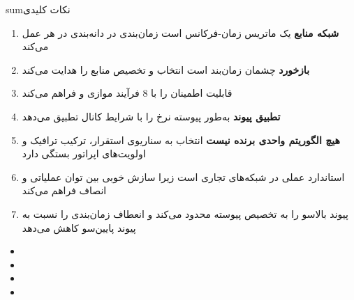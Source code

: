 \begin{CNbox}[unbreakable]{sum}{نکات کلیدی}

\begin{enumerate}
\def\labelenumi{\arabic{enumi}.}
\tightlist
\item
  \textbf{شبکه منابع} یک ماتریس زمان-فرکانس است  زمان‌بندی در دانه‌بندی  در هر  عمل می‌کند
\item
  \textbf{بازخورد } چشمان زمان‌بند است  انتخاب  و تخصیص منابع را هدایت می‌کند
\item
   قابلیت اطمینان را با 8 فرآیند موازی و  فراهم می‌کند
\item
  \textbf{تطبیق پیوند } به‌طور پیوسته نرخ را با شرایط کانال تطبیق می‌دهد
\item
  \textbf{هیچ الگوریتم واحدی برنده نیست}  انتخاب به سناریوی استقرار، ترکیب ترافیک و اولویت‌های اپراتور بستگی دارد
\item
   استاندارد عملی در شبکه‌های تجاری است زیرا سازش خوبی بین توان عملیاتی و انصاف فراهم می‌کند
\item
   پیوند بالاسو را به تخصیص پیوسته محدود می‌کند و انعطاف زمان‌بندی را نسبت به  پیوند پایین‌سو کاهش می‌دهد
\end{enumerate}

\end{CNbox}


\begin{itemize}
\tightlist
\item
\item
\item
\item
\end{itemize}
